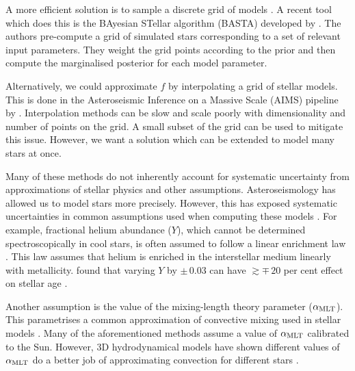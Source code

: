A more efficient solution is to sample a discrete grid of models \citep{Gruberbauer.Guenther.ea2012,Gruberbauer.Guenther.ea2013}. A recent tool which does this is the BAyesian STellar algorithm (BASTA) developed by \citet{AguirreBorsen-Koch.Rorsted.ea2022}. The authors pre-compute a grid of simulated stars corresponding to a set of relevant input parameters. They weight the grid points according to the prior and then compute the marginalised posterior for each model parameter.

Alternatively, we could approximate \(f\) by interpolating a grid of stellar models. This is done in the Asteroseismic Inference on a Massive Scale (AIMS) pipeline by \citet{Lund.Reese2018,Rendle.Buldgen.ea2019}. Interpolation methods can be slow and scale poorly with dimensionality and number of points on the grid. A small subset of the grid can be used to mitigate this issue. However, we want a solution which can be extended to model many stars at once.

Many of these methods do not inherently account for systematic uncertainty from approximations of stellar physics and other assumptions. Asteroseismology has allowed us to model stars more precisely. However, this has exposed systematic uncertainties in common assumptions used when computing these models \citep[e.g.][]{Tayar.Claytor.ea2022}. For example, fractional helium abundance (\(Y\)), which cannot be determined spectroscopically in cool stars, is often assumed to follow a linear enrichment law \citep{Chiosi.Matteucci1982,Ribas.Jordi.ea2000,Casagrande.Flynn.ea2007}. This law assumes that helium is enriched in the interstellar medium linearly with metallicity. \citet{Lebreton.Goupil.ea2014} found that varying \(Y\) by \(\pm\,0.03\) can have \(\gtrsim \mp\,20\) per cent effect on stellar age \citep{Lebreton.Goupil.ea2014}. 

Another assumption is the value of the mixing-length theory parameter (\({\alpha_\mathrm{MLT}}\)). This parametrises a common approximation of convective mixing used in stellar models \citep{Gough1977}. Many of the aforementioned methods assume a value of \({\alpha_\mathrm{MLT}}\) calibrated to the Sun. However, 3D hydrodynamical models have shown different values of \({\alpha_\mathrm{MLT}}\) do a better job of approximating convection for different stars \citep{Magic.Weiss.ea2015}.


